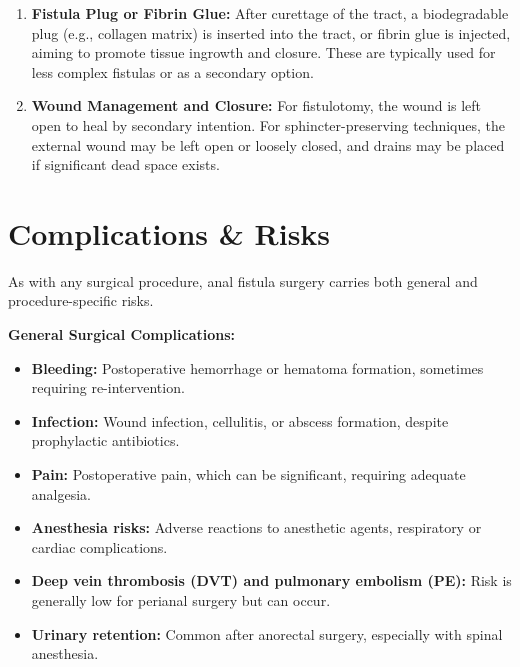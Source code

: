 \begin{enumerate}
  \item \textbf{Fistula Plug or Fibrin Glue:} After curettage of the tract, a biodegradable plug (e.g., collagen matrix) is inserted into the tract, or fibrin glue is injected, aiming to promote tissue ingrowth and closure. These are typically used for less complex fistulas or as a secondary option.
  \item \textbf{Wound Management and Closure:} For fistulotomy, the wound is left open to heal by secondary intention. For sphincter-preserving techniques, the external wound may be left open or loosely closed, and drains may be placed if significant dead space exists.
\end{enumerate}

\section*{Complications \& Risks}
As with any surgical procedure, anal fistula surgery carries both general and procedure-specific risks.

\textbf{General Surgical Complications:}
\begin{itemize}
  \item \textbf{Bleeding:} Postoperative hemorrhage or hematoma formation, sometimes requiring re-intervention.
  \item \textbf{Infection:} Wound infection, cellulitis, or abscess formation, despite prophylactic antibiotics.
  \item \textbf{Pain:} Postoperative pain, which can be significant, requiring adequate analgesia.
  \item \textbf{Anesthesia risks:} Adverse reactions to anesthetic agents, respiratory or cardiac complications.
  \item \textbf{Deep vein thrombosis (DVT) and pulmonary embolism (PE):} Risk is generally low for perianal surgery but can occur.
  \item \textbf{Urinary retention:} Common after anorectal surgery, especially with spinal anesthesia.
\end{itemize}

